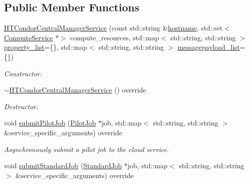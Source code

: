 \subsection*{Public Member Functions}
\begin{DoxyCompactItemize}
\item 
\hyperlink{classwrench_1_1_h_t_condor_central_manager_service_acc295c6ed3ed9d036d72a41150f4a05a}{H\+T\+Condor\+Central\+Manager\+Service} (const std\+::string \&\hyperlink{classwrench_1_1_s4_u___daemon_a52bc0b9a6cd248310749dac086819f00}{hostname}, std\+::set$<$ \hyperlink{classwrench_1_1_compute_service}{Compute\+Service} $\ast$$>$ compute\+\_\+resources, std\+::map$<$ std\+::string, std\+::string $>$ \hyperlink{classwrench_1_1_service_a032143b1e2d7296dde9b4ca1e34845ce}{property\+\_\+list}=\{\}, std\+::map$<$ std\+::string, std\+::string $>$ \hyperlink{classwrench_1_1_service_a63865f20c92027ab626ab1347b0099d2}{messagepayload\+\_\+list}=\{\})
\begin{DoxyCompactList}\small\item\em Constructor. \end{DoxyCompactList}\item 
\mbox{\label{classwrench_1_1_h_t_condor_central_manager_service_a3b956f9e6702d1531595feae39677979}} 
\hyperlink{classwrench_1_1_h_t_condor_central_manager_service_a3b956f9e6702d1531595feae39677979}{$\sim$\+H\+T\+Condor\+Central\+Manager\+Service} () override
\begin{DoxyCompactList}\small\item\em Destructor. \end{DoxyCompactList}\item 
void \hyperlink{classwrench_1_1_h_t_condor_central_manager_service_aa2fb9163f33416d64fe3ab16ac83361e}{submit\+Pilot\+Job} (\hyperlink{classwrench_1_1_pilot_job}{Pilot\+Job} $\ast$job, std\+::map$<$ std\+::string, std\+::string $>$ \&service\+\_\+specific\+\_\+arguments) override
\begin{DoxyCompactList}\small\item\em Asynchronously submit a pilot job to the cloud service. \end{DoxyCompactList}\item 
void \hyperlink{classwrench_1_1_h_t_condor_central_manager_service_a13c687548742cb39b6529e63a9b7e6a4}{submit\+Standard\+Job} (\hyperlink{classwrench_1_1_standard_job}{Standard\+Job} $\ast$job, std\+::map$<$ std\+::string, std\+::string $>$ \&service\+\_\+specific\+\_\+arguments) override
$$
\end{DoxyCompactItemize}
